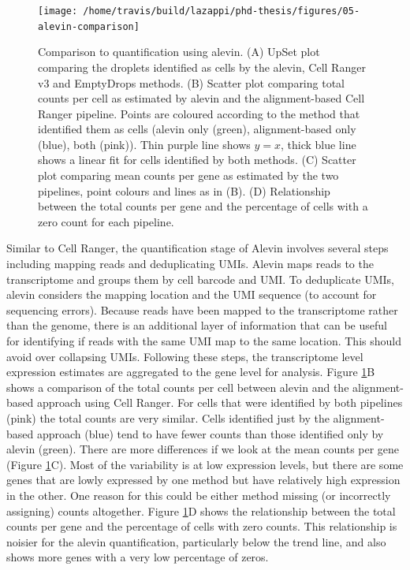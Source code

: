 \documentclass[11pt,a4paper,titlepage,twoside,openright]{style/unimelbthesis}
\theoremstyle{definition}
\theoremstyle{definition}
\theoremstyle{definition}
\theoremstyle{remark}
\begin{document}
\begin{mainmatter}
\begin{figure}

{\centering \texttt{[image: /home/travis/build/lazappi/phd-thesis/figures/05-alevin-comparison]} 

}

\caption[Comparison to quantification using alevin.]{Comparison to quantification using alevin. (A) UpSet plot comparing the droplets identified as cells by the alevin, Cell Ranger v3 and EmptyDrops methods. (B) Scatter plot comparing total counts per cell as estimated by alevin and the alignment-based Cell Ranger pipeline. Points are coloured according to the method that identified them as cells (alevin only (green), alignment-based only (blue), both (pink)). Thin purple line shows \(y = x\), thick blue line shows a linear fit for cells identified by both methods. (C) Scatter plot comparing mean counts per gene as estimated by the two pipelines, point colours and lines as in (B). (D) Relationship between the total counts per gene and the percentage of cells with a zero count for each pipeline.}\label{fig:alevin-comparison}
\end{figure}





Similar to Cell Ranger, the quantification stage of Alevin involves several steps including mapping reads and deduplicating UMIs. Alevin maps reads to the transcriptome and groups them by cell barcode and UMI. To deduplicate UMIs, alevin considers the mapping location and the UMI sequence (to account for sequencing errors). Because reads have been mapped to the transcriptome rather than the genome, there is an additional layer of information that can be useful for identifying if reads with the same UMI map to the same location. This should avoid over collapsing UMIs. Following these steps, the transcriptome level expression estimates are aggregated to the gene level for analysis. Figure \ref{fig:alevin-comparison}B shows a comparison of the total counts per cell between alevin and the alignment-based approach using Cell Ranger. For cells that were identified by both pipelines (pink) the total counts are very similar. Cells identified just by the alignment-based approach (blue) tend to have fewer counts than those identified only by alevin (green). There are more differences if we look at the mean counts per gene (Figure \ref{fig:alevin-comparison}C). Most of the variability is at low expression levels, but there are some genes that are lowly expressed by one method but have relatively high expression in the other. One reason for this could be either method missing (or incorrectly assigning) counts altogether. Figure \ref{fig:alevin-comparison}D shows the relationship between the total counts per gene and the percentage of cells with zero counts. This relationship is noisier for the alevin quantification, particularly below the trend line, and also shows more genes with a very low percentage of zeros.


\end{mainmatter}
\end{document}
